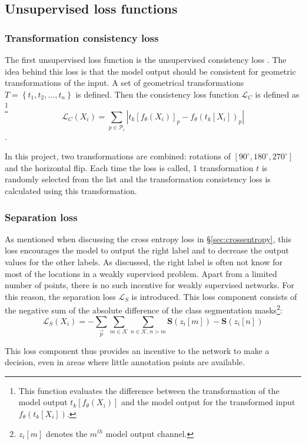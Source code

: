 \subsection{Unsupervised loss functions}

\subsubsection{Transformation consistency loss}
The first unsupervised loss function is the unsupervised consistency loss . 
The idea behind this loss is that the model output should be consistent for geometric transformations of the input.
A set of geometrical transformations $T=\left\{ t_1, t_2, \dots, t_n \right\}$ is defined. 
Then the consistency loss function $\mathcal{L}_C$ is defined as
\footnote{This function evaluates the difference between the transformation of the model output $t_k\left[f_\theta(X_i)\right]$ and the model output for the transformed input $f_\theta\left( t_k[X_i] \right)$.}
\begin{equation}
    \mathcal{L}_C(X_i) = \sum_{p \in \mathcal{P}_i} \left| t_k\left[f_\theta(X_i)\right]_p - f_\theta\left( t_k[X_i] \right)_p  \right|  
\end{equation}.

In this project, two transformations are combined: rotations of $[90^{\circ}, 180^{\circ}, 270^{\circ}]$ and the horizontal flip.
Each time the loss is called, 1 transformation $t$ is randomly selected from the list and the transformation consistency loss is calculated using this transformation.

\subsubsection{Separation loss}
As mentioned when discussing the cross entropy loss in §\ref{sec:crossentropy}, this loss encourages the model to output the right label and to decrease the output values for the other labels.
As discussed, the right label is often not know for most of the locations in a weakly supervised problem.
Apart from a limited number of points, there is no such incentive for weakly supervised networks.
For this reason, the separation loss $\mathcal{L}_S$ is introduced.
This loss component consists of the negative sum of the absolute difference of the class segmentation masks\footnote{$z_i[m]$ denotes the $m^{th}$ model output channel.}:
\begin{equation}
    \mathcal{L}_S(X_i) = - \sum_{\vec{p}} \sum_{m\in \mathcal{K}} \sum_{n \in \mathcal{K}, n>m} \mathbf{S}(z_i[m]) - \mathbf{S}(z_i[n])
\end{equation}

This loss component thus provides an incentive to the network to make a decision, even in areas where little annotation points are available.